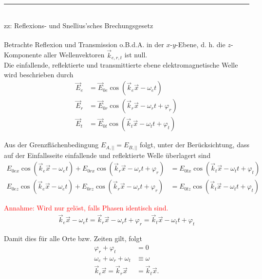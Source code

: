 \documentclass{article}
\begin{document}
\newpage


{\color{violet}
\hrule
	\\
	zz: Reflexions- und Snellius'sches Brechungsgesetz\\
	\\
	Betrachte Reflexion und Transmission o.B.d.A. in der $x$-$y$-Ebene, d. h. die $z$-Komponente aller Wellenvektoren $\vec{k}_{e,r,t}$ ist null.
	\\
	Die einfallende, reflektierte und transmittierte ebene elektromagnetische Welle wird beschrieben durch
		\begin{align*}
			\vec{E}_e &= \vec{E}_{0e} \cos(\vec{k}_e\vec{x} - \omega_e t) \\
			\vec{E}_r &= \vec{E}_{0r} \cos(\vec{k}_r\vec{x} - \omega_r t + \varphi_r) \\
			\vec{E}_t &= \vec{E}_{0t} \cos(\vec{k}_t\vec{x} - \omega_t t + \varphi_t)
		\end{align*}

	Aus der Grenzflächenbedingung $E_{A,||} = E_{B,||}$ folgt, unter der Berücksichtung, dass auf der Einfallsseite einfallende und reflektierte Welle überlagert sind
		\begin{align*}
			E_{0ex} \cos(\vec{k}_e\vec{x} - \omega_e t) + E_{0rx} \cos(\vec{k}_r\vec{x} - \omega_r t + \varphi_r) &= E_{0tx} \cos(\vec{k}_t\vec{x} - \omega_t t + \varphi_t) \\
			E_{0ez} \cos(\vec{k}_e\vec{x} - \omega_e t) + E_{0rz} \cos(\vec{k}_r\vec{x} - \omega_r t + \varphi_r) &= E_{0tz} \cos(\vec{k}_t\vec{x} - \omega_t t + \varphi_t)
		\end{align*}

	\textcolor{red}{Annahme: Wird nur gelöst, falls Phasen identisch sind.}
		\begin{align*}
			\vec{k}_e\vec{x} - \omega_e t = \vec{k}_r\vec{x} - \omega_r t + \varphi_r = \vec{k}_t\vec{x} - \omega_t t + \varphi_t
		\end{align*}
	
	Damit dies für alle Orte bzw. Zeiten gilt, folgt
		\begin{align*}
			\varphi_r + \varphi_t &= 0 \\
			\omega_e + \omega_r + \omega_t &\equiv \omega \\
			\vec{k}_e\vec{x} = \vec{k}_r\vec{x} &= \vec{k}_t\vec{x}.
		\end{align*}
	
}
\end{document}
